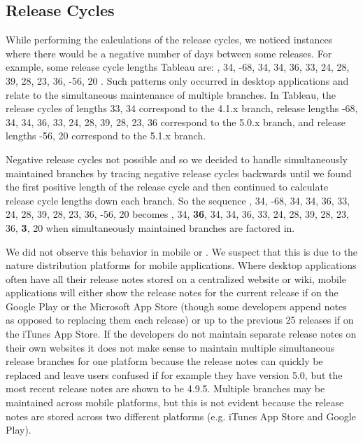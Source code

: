 \documentclass{acm_proc_article-sp}
\begin{document}
\subsection{Release Cycles}
While performing the calculations of the release cycles, we noticed instances where there would be a negative number of days between some releases.
For example, some release cycle lengths Tableau are: , 34, -68, 34, 34, 36, 33, 24, 28, 39, 28, 23, 36, -56, 20 \textellipsis\space . 
Such patterns only occurred in desktop applications and relate to the simultaneous maintenance of multiple branches. 
In Tableau, the release cycles of lengths 33, 34 correspond to the 4.1.x branch, release lengths -68, 34, 34, 36, 33, 24, 28, 39, 28, 23, 36 correspond to the 5.0.x branch, and release lengths -56, 20 correspond to the 5.1.x branch.



Negative release cycles not possible and so we decided to handle simultaneously maintained branches by tracing negative release cycles backwards until we found the first positive length of the release cycle and then continued to calculate release cycle lengths down each branch. 
So the sequence , 34, -68, 34, 34, 36, 33, 24, 28, 39, 28, 23, 36, -56, 20 \textellipsis becomes , 34, \textbf{36}, 34, 34, 36, 33, 24, 28, 39, 28, 23, 36, \textbf{3}, 20 \textellipsis when simultaneously maintained branches are factored in.

We did not observe this behavior in mobile or \sibs. We suspect that this is due to the nature distribution platforms for mobile applications.
Where desktop applications often have all their release notes stored on a centralized website or wiki, mobile applications will either show the release notes for the current release if on the Google Play or the Microsoft App Store (though some developers append notes as opposed to replacing them each release) or up to the previous 25 releases if on the iTunes App Store. 
If the developers do not maintain separate release notes on their own websites it does not make sense to maintain multiple simultaneous release branches for one platform because the release notes can quickly be replaced and leave users confused if for example they have version 5.0, but the most recent release notes are shown to be 4.9.5.
Multiple branches may be maintained across mobile platforms, but this is not evident because the release notes are stored across two different platforms (e.g. iTunes App Store and Google Play).
\end{document}
